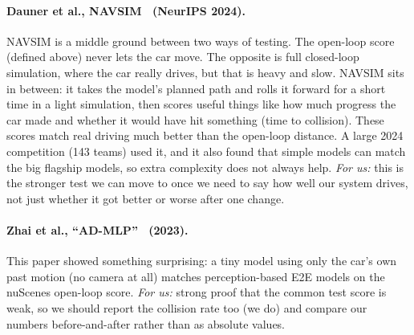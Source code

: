 \documentclass[11pt,a4paper]{article}
\begin{document}
\paragraph{Dauner et al., NAVSIM~\cite{dauner2024navsim} (NeurIPS 2024).}
NAVSIM is a middle ground between two ways of testing. The open-loop score
(defined above) never lets the car move. The opposite is full closed-loop
simulation, where the car really drives, but that is heavy and slow.
NAVSIM sits in between: it takes the model's planned path and rolls it
forward for a short time in a light simulation, then scores useful things
like how much progress the car made and whether it would have hit
something (time to collision). These scores match real driving much better
than the open-loop distance. A large 2024 competition (143 teams) used it,
and it also found that simple models can match the big flagship models, so
extra complexity does not always help. \emph{For us:} this is the stronger
test we can move to once we need to say how well our system drives, not
just whether it got better or worse after one change.

\paragraph{Zhai et al., ``AD-MLP''~\cite{zhai2023rethinking} (2023).}
This paper showed something surprising: a tiny model using only the car's
own past motion (no camera at all) matches perception-based E2E models on
the nuScenes open-loop score. \emph{For us:} strong proof that the common
test score is weak, so we should report the collision rate too (we do)
and compare our numbers before-and-after rather than as absolute values.
\end{document}
